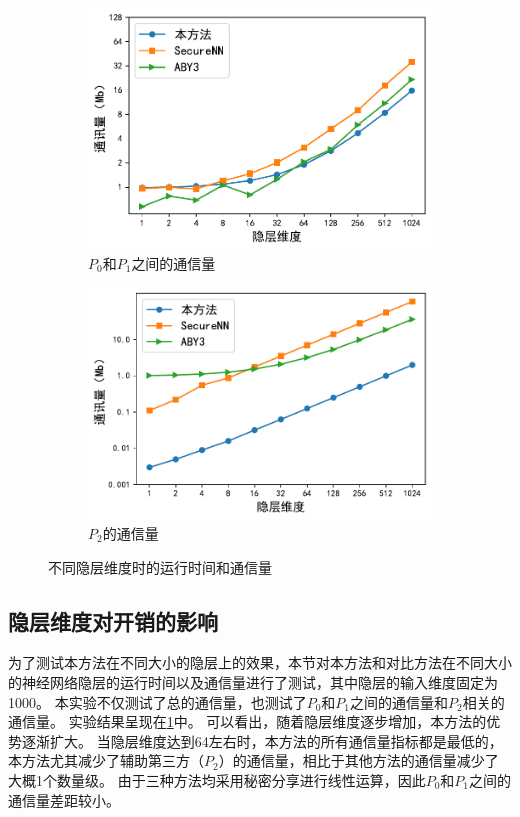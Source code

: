 \begin{figure}[h!]
    \begin{subfigure}[b]{0.48\linewidth}
    \centering
    \includegraphics[width=\linewidth]{Z_Resources/ss-perm_one-layer-c01.pdf}
    \caption{$P_0$和$P_1$之间的通信量}
    \end{subfigure}
    \begin{subfigure}[b]{0.48\linewidth}
    \centering
    \includegraphics[width=\linewidth]{Z_Resources/ss-perm_one-layer-c2.pdf}
    \caption{$P_2$的通信量}
    \end{subfigure}
\caption{不同隐层维度时的运行时间和通信量}
\label{fig:ss-perm:layer-dim}
\end{figure}

\subsection{隐层维度对开销的影响}
为了测试本方法在不同大小的隐层上的效果，本节对本方法和对比方法在不同大小的神经网络隐层的运行时间以及通信量进行了测试，其中隐层的输入维度固定为1000。
%
本实验不仅测试了总的通信量，也测试了$P_0$和$P_1$之间的通信量和$P_2$相关的通信量。
%
实验结果呈现在\ref{fig:ss-perm:layer-dim}中。
%
可以看出，随着隐层维度逐步增加，本方法的优势逐渐扩大。
当隐层维度达到64左右时，本方法的所有通信量指标都是最低的，本方法尤其减少了辅助第三方（$P_2$）的通信量，相比于其他方法的通信量减少了大概1个数量级。
由于三种方法均采用秘密分享进行线性运算，因此$P_0$和$P_1$之间的通信量差距较小。

